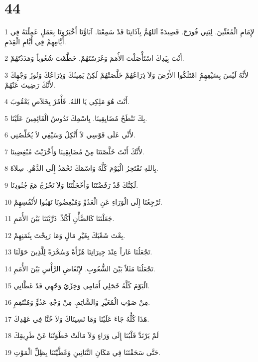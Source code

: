 \chapter{44}

\par 1 لإِمَامِ الْمُغَنِّينَ. لِبَنِي قُورَحَ. قَصِيدَةٌ اَللهُمَّ بِآذَانِنَا قَدْ سَمِعْنَا. آبَاؤُنَا أَخْبَرُونَا بِعَمَلٍ عَمِلْتَهُ فِي أَيَّامِهِمْ فِي أَيَّامِ الْقِدَمِ.
\par 2 أَنْتَ بِيَدِكَ اسْتَأْصَلْتَ الأُمَمَ وَغَرَسْتَهُمْ. حَطَّمْتَ شُعُوباً وَمَدَدْتَهُمْ.
\par 3 لأَنَّهُ لَيْسَ بِسَيْفِهِمُِ امْتَلَكُوا الأَرْضَ وَلاَ ذِرَاعُهُمْ خَلَّصَتْهُمْ لَكِنْ يَمِينُكَ وَذِرَاعُكَ وَنُورُ وَجْهِكَ لأَنَّكَ رَضِيتَ عَنْهُمْ.
\par 4 أَنْتَ هُوَ مَلِكِي يَا اللهُ. فَأْمُرْ بِخَلاَصِ يَعْقُوبَ.
\par 5 بِكَ نَنْطَحُ مُضَايِقِينَا. بِاسْمِكَ نَدُوسُ الْقَائِمِينَ عَلَيْنَا.
\par 6 لأَنِّي عَلَى قَوْسِي لاَ أَتَّكِلُ وَسَيْفِي لاَ يُخَلِّصُنِي.
\par 7 لأَنَّكَ أَنْتَ خَلَّصْتَنَا مِنْ مُضَايِقِينَا وَأَخْزَيْتَ مُبْغِضِينَا.
\par 8 بِاللهِ نَفْتَخِرُ الْيَوْمَ كُلَّهُ وَاسْمَكَ نَحْمَدُ إِلَى الدَّهْرِ. سِلاَهْ.
\par 9 لَكِنَّكَ قَدْ رَفَضْتَنَا وَأَخْجَلْتَنَا وَلاَ تَخْرُجُ مَعَ جُنُودِنَا.
\par 10 تُرْجِعُنَا إِلَى الْوَرَاءِ عَنِ الْعَدُوِّ وَمُبْغِضُونَا نَهَبُوا لأَنْفُسِهِمْ.
\par 11 جَعَلْتَنَا كَالضَّأْنِ أَكْلاً. ذَرَّيْتَنَا بَيْنَ الأُمَمِ.
\par 12 بِعْتَ شَعْبَكَ بِغَيْرِ مَالٍ وَمَا رَبِحْتَ بِثَمَنِهِمْ.
\par 13 تَجْعَلُنَا عَاراً عِنْدَ جِيرَانِنَا هُزْأَةً وَسُخْرَةً لِلَّذِينَ حَوْلَنَا.
\par 14 تَجْعَلُنَا مَثَلاً بَيْنَ الشُّعُوبِ. لإِنْغَاضِ الرَّأْسِ بَيْنَ الأُمَمِ.
\par 15 الْيَوْمَ كُلَّهُ خَجَلِي أَمَامِي وَخِزْيُ وَجْهِي قَدْ غَطَّانِي.
\par 16 مِنْ صَوْتِ الْمُعَيِّرِ وَالشَّاتِمِ. مِنْ وَجْهِ عَدُوٍّ وَمُنْتَقِمٍ.
\par 17 هَذَا كُلُّهُ جَاءَ عَلَيْنَا وَمَا نَسِينَاكَ وَلاَ خُنَّا فِي عَهْدِكَ.
\par 18 لَمْ يَرْتَدَّ قَلْبُنَا إِلَى وَرَاءٍ وَلاَ مَالَتْ خَطْوَتُنَا عَنْ طَرِيقِكَ
\par 19 حَتَّى سَحَقْتَنَا فِي مَكَانِ التَّنَانِينِ وَغَطَّيْتَنَا بِظِلِّ الْمَوْتِ.
